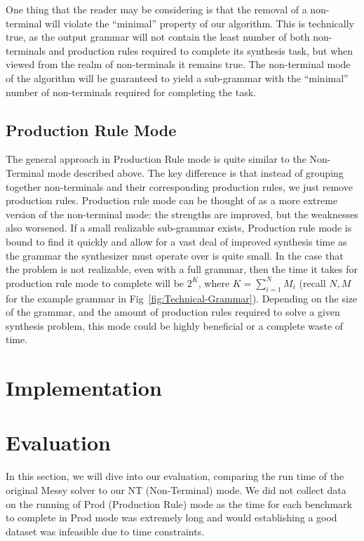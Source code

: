 \documentclass[acmsmall, nonacm]{acmart}
\begin{document}
One thing that the reader may be considering is that the removal of a non-terminal will violate the ``minimal'' property of our algorithm. This is technically true, as the output grammar will not contain the least number of both non-terminals and production rules required to complete its synthesis task, but when viewed from the realm of non-terminals it remains true. The non-terminal mode of the algorithm will be guaranteed to yield a sub-grammar with the ``minimal'' number of non-terminals required for completing the task.

\subsection{Production Rule Mode}
The general approach in Production Rule mode is quite similar to the Non-Terminal mode described above. The key difference is that instead of grouping together non-terminals and their corresponding production rules, we just remove production rules. Production rule mode can be thought of as a more extreme version of the non-terminal mode: the strengths are improved, but the weaknesses also worsened.
If a small realizable sub-grammar exists, Production rule mode is bound to find it quickly and allow for a vast deal of improved synthesis time as the grammar the synthesizer must operate over is quite small. In the case that the problem is not realizable, even with a full grammar, then the time it takes for production rule mode to complete will be $2^K$, where $K = \sum_{i = 1}^{N} M_i$ (recall $N,M$ for the example grammar in Fig~\ref{fig:Technical-Grammar}).
Depending on the size of the grammar, and the amount of production rules required
to solve a given synthesis problem, this mode could be highly beneficial or a complete waste of time.

\section{Implementation}

\section{Evaluation}

In this section, we will dive into our evaluation, comparing the run time of the original Messy solver to our NT (Non-Terminal) mode. We did not collect data on the running of Prod (Production Rule) mode as the time for each benchmark to complete in Prod mode was extremely long and would establishing a good dataset was infeasible due to time constraints.
\end{document}
